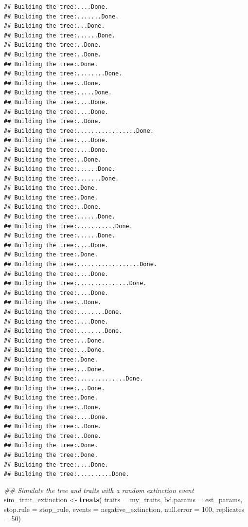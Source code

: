 \documentclass[
]{book}
\newenvironment{Shaded}{\begin{snugshade}}{\end{snugshade}}
\newcommand{\CommentTok}[1]{\textcolor[rgb]{0.56,0.35,0.01}{\textit{#1}}}
\newcommand{\DataTypeTok}[1]{\textcolor[rgb]{0.13,0.29,0.53}{#1}}
\newcommand{\DecValTok}[1]{\textcolor[rgb]{0.00,0.00,0.81}{#1}}
\newcommand{\KeywordTok}[1]{\textcolor[rgb]{0.13,0.29,0.53}{\textbf{#1}}}
\newcommand{\NormalTok}[1]{#1}
\newcommand{\StringTok}[1]{\textcolor[rgb]{0.31,0.60,0.02}{#1}}
\begin{document}
\begin{verbatim}
## Building the tree:....Done.
## Building the tree:.......Done.
## Building the tree:...Done.
## Building the tree:......Done.
## Building the tree:..Done.
## Building the tree:..Done.
## Building the tree:.Done.
## Building the tree:........Done.
## Building the tree:..Done.
## Building the tree:.....Done.
## Building the tree:....Done.
## Building the tree:....Done.
## Building the tree:..Done.
## Building the tree:.................Done.
## Building the tree:....Done.
## Building the tree:....Done.
## Building the tree:..Done.
## Building the tree:......Done.
## Building the tree:.......Done.
## Building the tree:.Done.
## Building the tree:.Done.
## Building the tree:..Done.
## Building the tree:......Done.
## Building the tree:...........Done.
## Building the tree:......Done.
## Building the tree:....Done.
## Building the tree:.Done.
## Building the tree:..................Done.
## Building the tree:....Done.
## Building the tree:...............Done.
## Building the tree:....Done.
## Building the tree:..Done.
## Building the tree:........Done.
## Building the tree:....Done.
## Building the tree:........Done.
## Building the tree:...Done.
## Building the tree:...Done.
## Building the tree:.Done.
## Building the tree:...Done.
## Building the tree:..............Done.
## Building the tree:...Done.
## Building the tree:.Done.
## Building the tree:..Done.
## Building the tree:....Done.
## Building the tree:..Done.
## Building the tree:..Done.
## Building the tree:.Done.
## Building the tree:.Done.
## Building the tree:....Done.
## Building the tree:..........Done.
\end{verbatim}

\begin{Shaded}
\begin{Highlighting}[]
\CommentTok{\#\# Simulate the tree and traits with a random extinction event}
\NormalTok{sim\_trait\_extinction \textless{}{-}}\StringTok{ }\KeywordTok{treats}\NormalTok{(}
                   \DataTypeTok{traits     =}\NormalTok{ my\_traits,}
                   \DataTypeTok{bd.params  =}\NormalTok{ est\_params,}
                   \DataTypeTok{stop.rule  =}\NormalTok{ stop\_rule,}
                   \DataTypeTok{events     =}\NormalTok{ negative\_extinction,}
                   \DataTypeTok{null.error =} \DecValTok{100}\NormalTok{,}
                   \DataTypeTok{replicates =} \DecValTok{50}\NormalTok{)}
\end{Highlighting}
\end{Shaded}
\end{document}
